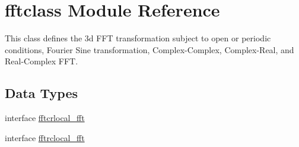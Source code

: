 \hypertarget{namespacefftclass}{}\section{fftclass Module Reference}
\label{namespacefftclass}


This class defines the 3d F\+FT transformation subject to open or periodic conditions, Fourier Sine transformation, Complex-\/\+Complex, Complex-\/\+Real, and Real-\/\+Complex F\+FT.  


\subsection*{Data Types}
\begin{DoxyCompactItemize}
\item 
interface \mbox{\hyperlink{interfacefftclass_1_1fftcrlocal__fft}{fftcrlocal\+\_\+fft}}
\item 
interface \mbox{\hyperlink{interfacefftclass_1_1fftrclocal__fft}{fftrclocal\+\_\+fft}}
\end{DoxyCompactItemize}
